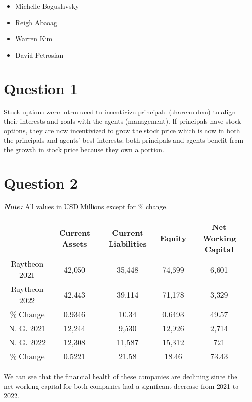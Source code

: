 \documentclass{article}
\begin{document}
\begin{itemize}[label=,leftmargin=0pt]
  \setlength\itemsep{-0.5em}
\item Michelle Boguslavsky
\item Reigh Abaoag
\item Warren Kim
\item David Petrosian
\end{itemize}


\section*{Question 1}
Stock options were introduced to incentivize principals (shareholders) to align their interests and
goals with the agents (management). If principals have stock options, they are now incentivized to
grow the stock price which is now in both the principals and agents' best interests: both principals
and agents benefit from the growth in stock price because they own a portion.


\section*{Question 2}
\textbf{\textit{Note:}} All values in USD Millions except for \% change. \\
\begin{adjustbox}{center}
  \begin{tabular}{|c|c|c|c|c|}
    \hline
    & Current Assets & Current Liabilities & Equity & Net Working Capital \\ \hline
    Raytheon 2021 & 42,050 & 35,448 & 74,699 & 6,601 \\ \hline
    Raytheon 2022 & 42,443 & 39,114 & 71,178 & 3,329 \\ \hline
    \% Change& 0.9346 & 10.34 & 0.6493 & 49.57 \\ \hline
    N. G. 2021 & 12,244 & 9,530 & 12,926 & 2,714 \\ \hline
    N. G. 2022 & 12,308 & 11,587 & 15,312 & 721 \\ \hline
    \% Change & 0.5221 & 21.58 & 18.46 & 73.43 \\ \hline
  \end{tabular}
\end{adjustbox}
\newline
\newline
\newline
We can see that the financial health of these companies are declining since the net working capital
for both companies had a significant decrease from 2021 to 2022.
\end{document}

